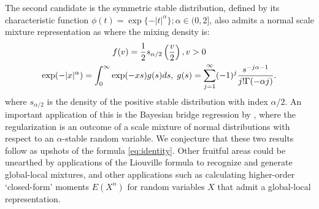 \documentclass[lineno]{biometrika}
\begin{document}
The second candidate is the symmetric stable distribution, defined by its characteristic function $\phi(t) = \exp\{ -|t|^{\alpha} \}; \alpha \in (0,2]$, also admits a normal scale mixture representation as where the mixing density is: 
\begin{gather*}
f(v) = \frac{1}{2} s_{\alpha/2} \left( \frac{v}{2} \right), v > 0 \\
\exp(-|x|^\alpha) = \int_0^{\infty} \exp(-xs) g(s) ds, \; g(s) = \sum_{j=1}^{\infty} (-1)^j \frac{s^{-j\alpha-1}}{j! \Gamma(-\alpha j)}.
\end{gather*}
where $s_{\alpha/2}$ is the density of the positive stable distribution with index $\alpha / 2$. An important application of this is the Bayesian bridge regression by \cite{polson2014bayesian}, where the regularization is an outcome of a scale mixture of normal distributions with respect to an $\alpha$-stable random variable. We conjecture that these two results follow as upshots of the \CS formula \eqref{eq:identity}. Other fruitful areas could be unearthed by applications of the Liouville formula to recognize and generate global-local mixtures, and other applications such as calculating higher-order `closed-form' moments $E(X^n)$ for random variables $X$ that admit a global-local representation. 

%


\end{document}
